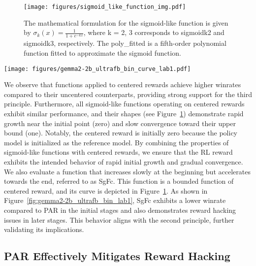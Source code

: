 \begin{figure}[htbp]
\centering
\texttt{[image: figures/sigmoid\_like\_function\_img.pdf]}
\caption{The mathematical formulation for the sigmoid-like function is given by $\sigma_k (x) = \frac{1}{1+e^{-kx}}$, where k = 2, 3 corresponds to sigmoidk2 and sigmoidk3, respectively. The poly\_fitted is a fifth-order polynomial function fitted to approximate the sigmoid function.}
\label{fig:sigmoid-like_function}
\end{figure}

\begin{figure*}[t]
\centering
\texttt{[image: figures/gemma2-2b\_ultrafb\_bin\_curve\_lab1.pdf]}
\caption{PPO training curve for different mitigation methods on Gemma2-2B and Ultrafeedback-Binarized.  Solid lines denote the Proxy Reward, and dashed lines denote the Winrate.  Vanilla PPO demonstrates significant reward hacking. ODIN, Reg, Meanstd, Clip, and LSC fail to mitigate this issue, indicated by increasing proxy rewards but decreasing winrates.  PAR achieves highest winrate at the end of training.}
\label{fig:gemma2-2b_ultrafb_bin_lab1}
\end{figure*}

We observe that functions applied to centered rewards achieve higher winrates compared to their uncentered counterparts, providing strong support for the third principle. Furthermore, all sigmoid-like functions operating on centered rewards exhibit similar performance, and their shapes (see Figure~\ref{fig:sigmoid-like_function}) demonstrate rapid growth near the initial point (zero) and slow convergence toward their upper bound (one).
Notably, the centered reward is initially zero because the policy model is initialized as the reference model. By combining the properties of sigmoid-like functions with centered rewards, we ensure that the RL reward exhibits the intended behavior of rapid initial growth and gradual convergence.
We also evaluate a function that increases slowly at the beginning but accelerates towards the end, referred to as SgFc. This function is a bounded function of centered reward, and its curve is depicted in Figure~\ref{fig:sigmoid-like_function}. As shown in Figure~\ref{fig:gemma2-2b_ultrafb_bin_lab1}, SgFc exhibits a lower winrate compared to PAR in the initial stages and also demonstrates reward hacking issues in later stages. This behavior aligns with the second principle, further validating its implications.

\subsection{PAR Effectively Mitigates Reward Hacking}

